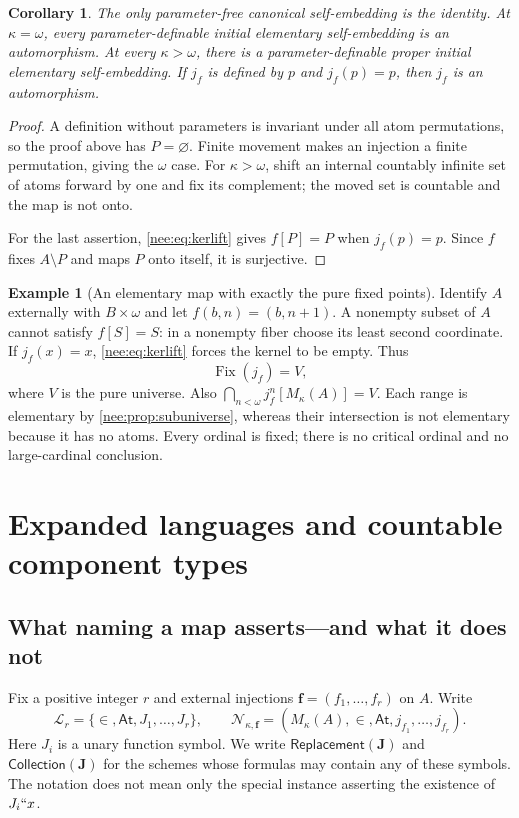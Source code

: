 \documentclass[11pt,letterpaper]{article}
\numberwithin{equation}{section}
\theoremstyle{plain}
\newtheorem{corollary}[corollary]{Corollary}
\theoremstyle{definition}
\newtheorem{example}[example]{Example}
\theoremstyle{remark}
\newcommand{\At}{\mathsf{At}}
\newcommand{\Rep}{\mathsf{Replacement}}
\newcommand{\Coll}{\mathsf{Collection}}
\newcommand{\Fix}{\operatorname{Fix}}
\newcommand{\Langr}{\mathcal L_r}
\begin{document}
\begin{corollary}\label{nee:cor:defcases}
The only parameter-free canonical self-embedding is the identity. At $\kappa=\omega$, every parameter-definable initial elementary self-embedding is an automorphism. At every $\kappa>\omega$, there is a parameter-definable proper initial elementary self-embedding. If $j_f$ is defined by $p$ and $j_f(p)=p$, then $j_f$ is an automorphism.
\end{corollary}
\begin{proof}
A definition without parameters is invariant under all atom permutations, so the proof above has $P=\varnothing$. Finite movement makes an injection a finite permutation, giving the $\omega$ case. For $\kappa>\omega$, shift an internal countably infinite set of atoms forward by one and fix its complement; the moved set is countable and the map is not onto.

For the last assertion, \eqref{nee:eq:kerlift} gives $f[P]=P$ when $j_f(p)=p$. Since $f$ fixes $A\setminus P$ and maps $P$ onto itself, it is surjective.
\end{proof}

\begin{example}[An elementary map with exactly the pure fixed points]\label{nee:ex:pureshift}
Identify $A$ externally with $B\times\omega$ and let $f(b,n)=(b,n+1)$. A nonempty subset of $A$ cannot satisfy $f[S]=S$: in a nonempty fiber choose its least second coordinate. If $j_f(x)=x$, \eqref{nee:eq:kerlift} forces the kernel to be empty. Thus
\[
\Fix(j_f)=V,
\]
where $V$ is the pure universe. Also $\bigcap_{n<\omega}j_f^n[M_\kappa(A)]=V$. Each range is elementary by \cref{nee:prop:subuniverse}, whereas their intersection is not elementary because it has no atoms. Every ordinal is fixed; there is no critical ordinal and no large-cardinal conclusion.
\end{example}

\section{Expanded languages and countable component types}\label{nee:sec:components}

\subsection{What naming a map asserts---and what it does not}
Fix a positive integer $r$ and external injections $\boldsymbol f=(f_1,\ldots,f_r)$ on $A$. Write
\[
\Langr=\{\in,\At,J_1,\ldots,J_r\},\qquad
\mathcal N_{\kappa,\boldsymbol f}=(M_\kappa(A),\in,\At,j_{f_1},\ldots,j_{f_r}).
\]
Here $J_i$ is a unary function symbol. We write $\Rep(\boldsymbol J)$ and $\Coll(\boldsymbol J)$ for the schemes whose formulas may contain any of these symbols. The notation does not mean only the special instance asserting the existence of $J_i``x$.
\end{document}
